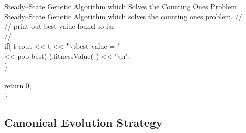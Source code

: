 \begin{programlisting}{Steady--State Genetic Algorithm which Solves the Counting Ones Problem}{
    Steady--State Genetic Algorithm which solves the counting ones problem.}
        //\\
        // print out best value found so far\\
        //\\
        if( t %
            cout << t << "$\backslash$tbest value = "\\
                 << pop.best( ).fitnessValue( ) << "$\backslash$n";\\
    \}\\
\\
    return 0;\\
\}\\
\end{programlisting}

\clearpage
\subsection{Canonical Evolution Strategy}

